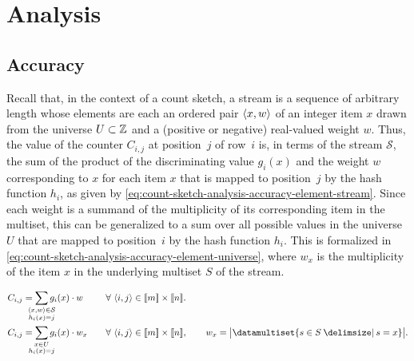 \section{Analysis}
\label{sec:count-sketch-analysis}

\subsection{Accuracy}
\label{subsec:count-sketch-analysis-accuracy}

Recall that, in the context of a count sketch, a stream is a sequence of arbitrary length whose elements are each an ordered pair \( \langle x, w\rangle \) of an integer item \( x \) drawn from the universe \( U \subset \mathbb{Z} \) and a (positive or negative) real-valued weight \( w \).
Thus, the value of the counter \( C_{i, j} \) at position~\( j \) of row~\( i \) is, in terms of the stream \( \mathcal{S} \), the sum of the product of the discriminating value \( g_{i} (x) \) and the weight \( w \) corresponding to \( x \) for each item \( x \) that is mapped to position~\( j \) by the hash function \( h_{i} \), as given by \cref{eq:count-sketch-analysis-accuracy-element-stream}.
Since each weight is a summand of the multiplicity of its corresponding item in the multiset, this can be generalized to a sum over all possible values in the universe \( U \) that are mapped to position~\( i \) by the hash function \( h_{i} \).
This is formalized in \cref{eq:count-sketch-analysis-accuracy-element-universe}, where \( w_{x} \) is the multiplicity of the item \( x \) in the underlying multiset \( S \) of the stream.

\begin{alignat}{2}
  \label{eq:count-sketch-analysis-accuracy-element-stream}
  C_{i, j} &= \smashoperator{\sum_{\substack{\datasequence{x, w} \in \mathcal{S} \\ h_{i} (x) = j}}} g_{i} (x) \cdot w & \quad &\forall\ \datasequence{i, j} \in \dataintegerinterval{m} \times \dataintegerinterval{n}. \\
  \label{eq:count-sketch-analysis-accuracy-element-universe}
  C_{i, j} &= \smashoperator{\sum_{\substack{x \in U \\ h_{i} (x) = j}}} g_{i} (x) \cdot w_{x} & \quad &\forall\ \datasequence{i, j} \in \dataintegerinterval{m} \times \dataintegerinterval{n}, \qquad w_{x} = \cardinality[\big]{\datamultiset{s \in S \suchthat s = x}}.
\end{alignat}

